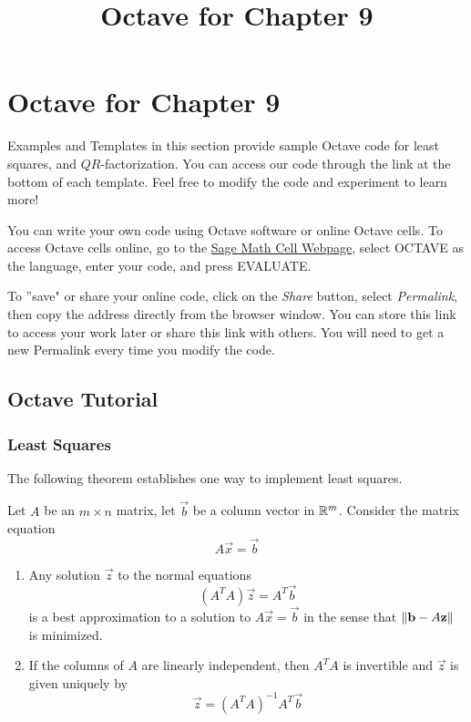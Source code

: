 \documentclass{ximera}
\title{Octave for Chapter 9} \license{CC BY-NC-SA 4.0}
\begin{document}
\begin{abstract}
\end{abstract}
\maketitle

\section*{Octave for Chapter 9}

Examples and Templates in this section provide sample Octave code for least squares, and $QR$-factorization. You can access our code through the link at the bottom of each template.  Feel free to modify the code and experiment to learn more!  

You can write your own code using Octave software or online Octave cells.  To access Octave cells online, go to the \href{https://sagecell.sagemath.org/}{Sage Math Cell Webpage}, select OCTAVE as the language, enter your code, and press EVALUATE.  

To ''save" or share your online code, click on the \emph{Share} button, select \emph{Permalink}, then copy the address directly from the browser window.  You can store this link to access your work later or share this link with others.  You will need to get a new Permalink every time you modify the code.

\subsection*{Octave Tutorial}
\subsubsection*{Least Squares}
The following theorem establishes one way to implement least squares.

\begin{theorem}[\ref{th:bestApprox}]
    Let $A$ be an $m\times n$ matrix, let $\vec{b}$ be a column vector in $\mathbb{R}^m$.  Consider the matrix equation
    $$A\vec{x}=\vec{b}$$
    \begin{enumerate}
        \item Any solution $\vec{z}$ to the normal equations
        $$\left(A^TA\right)\vec{z}=A^T\vec{b}$$
        is a best approximation to a solution to $A\vec{x}=\vec{b}$ in the sense that $\left\lVert\mathbf{b}-A\mathbf{z}\right\rVert$ is minimized.
        \item If the columns of $A$ are linearly independent, then $A^TA$ is invertible and $\vec{z}$ is given uniquely by
        $$\vec{z}=\left(A^TA\right)^{-1}A^T\vec{b}$$
    \end{enumerate}
    \end{theorem}
\end{document}
